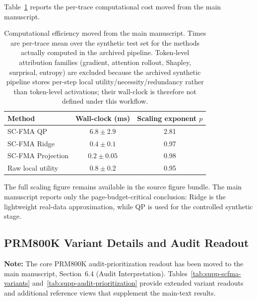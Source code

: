 \documentclass[a4paper,fleqn]{cas-sc}
\begin{document}
Table~\ref{tab:supp-efficiency} reports the per-trace computational cost moved from the main manuscript.

\begin{table}[ht]
\caption{Computational efficiency moved from the main manuscript. Times are per-trace mean over the synthetic test set for the methods actually computed in the archived pipeline. Token-level attribution families (gradient, attention rollout, Shapley, surprisal, entropy) are excluded because the archived synthetic pipeline stores per-step local utility/necessity/redundancy rather than token-level activations; their wall-clock is therefore not defined under this workflow.}
\label{tab:supp-efficiency}
\centering
\small
\begin{tabular}{lcc}
\toprule
\textbf{Method} & \textbf{Wall-clock (ms)} & \textbf{Scaling exponent $p$} \\
\midrule
SC-FMA QP & $6.8 \pm 2.9$ & 2.81 \\
SC-FMA Ridge & $0.4 \pm 0.1$ & 0.97 \\
SC-FMA Projection & $0.2 \pm 0.05$ & 0.98 \\
Raw local utility & $0.8 \pm 0.2$ & 0.95 \\
\bottomrule
\end{tabular}
\end{table}

The full scaling figure remains available in the source figure bundle. The main manuscript reports only the page-budget-critical conclusion: Ridge is the lightweight real-data approximation, while QP is used for the controlled synthetic stage.

\subsection{PRM800K Variant Details and Audit Readout}
\label{app:prm800k-variant-details}

\noindent\textbf{Note:} The core PRM800K audit-prioritization readout has been moved to the main manuscript, Section~6.4 (Audit Interpretation). Tables~\ref{tab:supp-scfma-variants} and~\ref{tab:supp-audit-prioritization} provide extended variant readouts and additional reference views that supplement the main-text results.
\end{document}
